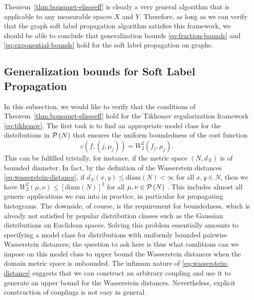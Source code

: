 \documentclass[letterpaper]{article} %
\begin{document}
Theorem~\ref{thm:bousquet-elisseeff} is clearly a very general algorithm that is applicable to any measurable spaces $X$ and $Y$. Therefore, as long as we can verify that the graph soft label propagation algorithm satisfies this framework, we should be able to conclude that generalization bounds \eqref{eq:fraction-bounds} and \eqref{eq:exponential-bounds} hold for the soft label propagation on graphs.

\subsection{Generalization bounds for Soft Label Propagation} 
In this subsection, we would like to verify that the conditions of Theorem~\ref{thm:bousquet-elisseeff} hold for the Tikhonov regularization framework \eqref{eq:tikhonov}.
The first task is to find an appropriate model class for the distributions in $\P\left( N \right)$ that ensures the uniform boundedness of the cost function
\begin{equation}
  \label{eq:wasserstein-cost-func}
    c\left( f, \left( j,\mu_j \right) \right)=W_2^2 \left( f_j,\mu_j \right).
\end{equation}
This can be fulfilled trivially, for instance, if the metric space $\left( N,d_N \right)$ is of bounded diameter. In fact, by the definition of the Wasserstein distances \eqref{eq:wasserstein-distance}, if $d_N \left( x,y \right)\leq \mathrm{diam}\left( N \right)<\infty$ for all $x,y\in N$, then we have $W_2^2 \left( \mu,\nu \right)\leq \left[\mathrm{diam}\left( N \right)\right]^2$ for all $\mu,\nu\in \P\left( N \right)$ .
This includes almost all generic applications we run into in practice, in particular for propagating histograms. The downside, of course, is the requirement for boundedness, which is already not satisfied by popular distribution classes such as the Gaussian distributions on Euclidean spaces. Solving this problem essentially amounts to specifying a model class for distributions with uniformly bounded pairwise Wasserstein distances; the question to ask here is thus what conditions can we impose on this model class to upper bound the Wasserstein distances when the domain metric space is unbounded. The infimum nature of \eqref{eq:wasserstein-distance} suggests that we can construct an arbitrary coupling and use it to generate an upper bound for the Wasserstein distances. Nevertheless, explicit construction of couplings is not easy in general.
\end{document}
